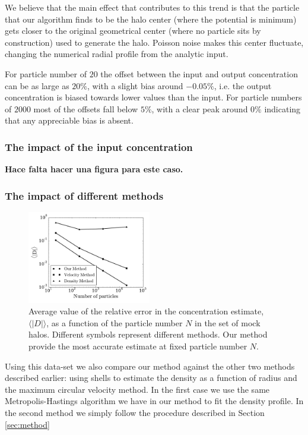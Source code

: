 \documentclass[useAMS,usenatbib]{mn2e}
\newcommand{\avg}[1]{\langle{#1}\rangle}
\begin{document}
We believe that the main effect that contributes to this trend
is that the particle that our algorithm finds to be the halo center
(where the potential is minimum) gets closer to the original
geometrical center (where no particle sits by construction) used to
generate the halo.  Poisson noise makes this center fluctuate,
changing the numerical radial profile from the analytic input.

For particle number of $20$ the offset between the input and output
concentration can be as large as $20\%$, with a slight bias around
$-0.05\%$, i.e. the output concentration is biased towards lower
values than the input.
For particle numbers of $2000$ most of the offsets fall below $5\%$,
with a clear peak around $0\%$ indicating that any appreciable bias is
absent.


\subsubsection{The impact of the input concentration}

{\bf Hace falta hacer una figura para este caso.}

\subsubsection{The impact of different methods}

\begin{figure}
\begin{center}
  \includegraphics[width=0.48\textwidth]{error.pdf}
\end{center}
\caption{Average value of the relative error in the concentration
  estimate, $\avg{|D|}$, as a function of the particle number $N$ in
  the set of mock halos. Different symbols represent different
  methods. Our method provide the most accurate estimate at fixed
  particle number $N$.
    \label{fig:error}}
\end{figure}


Using this data-set we also compare our method against the other two
methods described earlier: using shells to estimate the density as a
function of radius and the maximum circular velocity method.
In the first case we use the same Metropolis-Hastings algorithm we
have in our method to fit the density profile.
In the second method we simply follow the procedure described in
Section \ref{sec:method}
\end{document}
